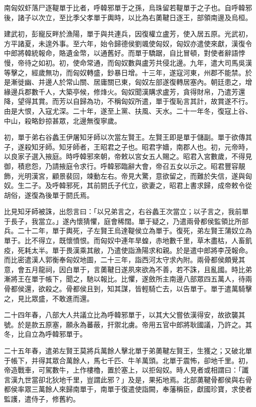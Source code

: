
\begin{pinyinscope}
南匈奴虾落尸逐鞮單于比者，呼韓邪單于之孫，烏珠留若鞮單于之子也。自呼韓邪後，諸子以次立，至比季父孝單于輿時，以比為右薁鞬日逐王，部領南邊及烏桓。

建武初，彭寵反畔於漁陽，單于與共連兵，因復權立盧芳，使入居五原。光武初，方平諸夏，未遑外事。至六年，始令歸德侯劉颯使匈奴，匈奴亦遣使來獻，漢復令中郎將韓統報命，賂遺金幣，以通舊好。而單于驕踞，自比冒頓，對使者辭語悖慢，帝待之如初。初，使命常通，而匈奴數與盧芳共侵北邊。九年，遣大司馬吳漢等擊之，經歲無功，而匈奴轉盛，鈔暴日增。十三年，遂寇河東，州郡不能禁。於是漸徙幽、并邊人於常山關、居庸關已東，匈奴左部遂復轉居塞內。朝廷患之，增緣邊兵郡數千人，大築亭候，修烽火。匈奴聞漢購求盧芳，貪得財帛，乃遣芳還降，望得其賞。而芳以自歸為功，不稱匈奴所遣，單于復恥言其計，故賞遂不行。由是大恨，入寇尤深。二十年，遂至上黨、扶風、天水。二十一年冬，復寇上谷、中山，殺略鈔掠甚眾，北邊無復寧歲。

初，單于弟右谷蠡王伊屠知牙師以次當左賢王。左賢王即是單于儲副。單于欲傳其子，遂殺知牙師。知牙師者，王昭君之子也。昭君字嬙，南郡人也。初，元帝時，以良家子選入掖庭。時呼韓邪來朝，帝敕以宮女五人賜之。昭君入宮數歲，不得見御，積悲怨，乃請掖庭令求行。呼韓邪臨辭大會，帝召五女以示之。昭君豐容靚飾，光明漢宮，顧景裴回，竦動左右。帝見大驚，意欲留之，而難於失信，遂與匈奴。生二子。及呼韓邪死，其前閼氏子代立，欲妻之，昭君上書求歸，成帝敕令從胡俗，遂復為後單于閼氏焉。

比見知牙師被誅，出怨言曰：「以兄弟言之，右谷蠡王次當立；以子言之，我前單于長子，我當立。」遂內懷猜懼，庭會稀闊。單于疑之，乃遣兩骨都侯監領比所部兵。二十二年，單于輿死，子左賢王烏達鞮侯立為單于。復死，弟左賢王蒲奴立為單于。比不得立，既懷憤恨。而匈奴中連年旱蝗，赤地數千里，草木盡枯，人畜飢疫，死耗太半。單于畏漢乘其敝，乃遣使詣漁陽求和親。於是遣中郎將李茂報命。而比密遣漢人郭衡奉匈奴地圖，二十三年，詣西河太守求內附。兩骨都侯頗覺其意，會五月龍祠，因白單于，言薁鞬日遂夙來欲為不善，若不誅，且亂國。時比弟漸將王在單于帳下，聞之，馳以報比。比懼，遂斂所主南邊八部眾四五萬人，待兩骨都侯還，欲殺之。骨都侯且到，知其謀，皆輕騎亡去，以告單于。單于遣萬騎擊之，見比眾盛，不敢進而還。

二十四年春，八部大人共議立比為呼韓邪單于，以其大父嘗依漢得安，故欲襲其號。於是款五原塞，願永為蕃蔽，扞禦北虜。帝用五官中郎將耿國議，乃許之。其冬，比自立為呼韓邪單于。

二十五年春，遣弟左賢王莫將兵萬餘人擊北單于弟薁鞬左賢王，生獲之；又破北單于帳下，并得其眾合萬餘人，馬七千匹、牛羊萬頭。北單于震怖，卻地千里。初，帝造戰車，可駕數牛，上作樓櫓，置於塞上，以拒匈奴。時人見者或相謂曰：「讖言漢九世當卻北狄地千里，豈謂此邪？」及是，果拓地焉。北部薁鞬骨都侯與右骨都侯率眾三萬餘人來歸南單于，南單于復遣使詣闕，奉藩稱臣，獻國珍寶，求使者監護，遣侍子，修舊約。


\end{pinyinscope}
